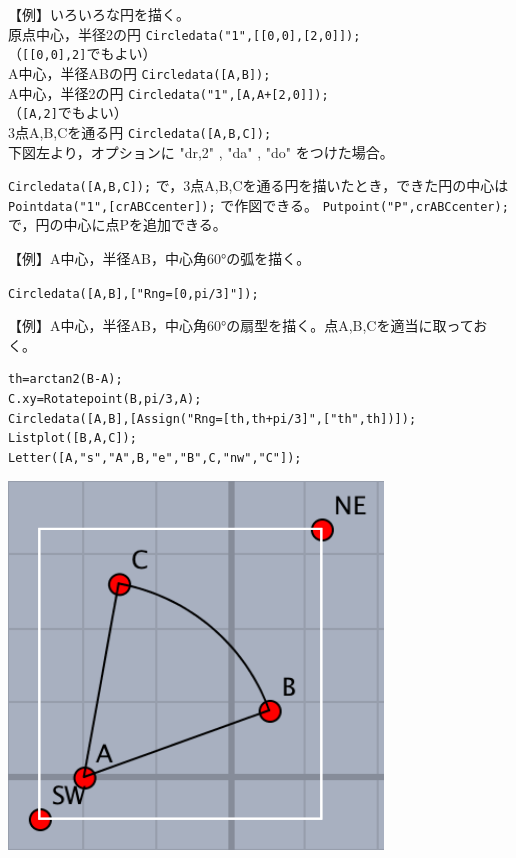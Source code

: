 \documentclass[papersize,a4paper,10pt,uplatex]{jsarticle}
\begin{document}
\begin{description}
\begin{tabbing}
【例】いろいろな円を描く。\\
 \>原点中心，半径2の円\> \verb|Circledata("1",[[0,0],[2,0]]);|\\
  \hspace{50mm}（\verb|[[0,0],2]|でもよい）\\
 \>A中心，半径ABの円\> \verb|Circledata([A,B]);|\\
 \>A中心，半径2の円\> \verb|Circledata("1",[A,A+[2,0]]);|\\
  \hspace{50mm}（\verb|[A,2]|でもよい）\\
 \>3点A,B,Cを通る円\> \verb|Circledata([A,B,C]);|\\
 \>下図左より，オプションに "dr,2" , "da" , "do" をつけた場合。
\end{tabbing}
\hspace{10mm} 
\vspace{\baselineskip}


 \verb|Circledata([A,B,C]);| で，3点A,B,Cを通る円を描いたとき，できた円の中心は \verb|Pointdata("1",[crABCcenter]);| で作図できる。
 \verb|Putpoint("P",crABCcenter);| で，円の中心に点Pを追加できる。%
 
\vspace{\baselineskip}
【例】A中心，半径AB，中心角60°の弧を描く。

\hspace{10mm}\verb|Circledata([A,B],["Rng=[0,pi/3]"]); |

\vspace{\baselineskip}
【例】A中心，半径AB，中心角60°の扇型を描く。点A,B,Cを適当に取っておく。

\begin{verbatim}
th=arctan2(B-A);
C.xy=Rotatepoint(B,pi/3,A);
Circledata([A,B],[Assign("Rng=[th,th+pi/3]",["th",th])]);
Listplot([B,A,C]); 
Letter([A,"s","A",B,"e","B",C,"nw","C"]);
\end{verbatim}

\begin{center}
\includegraphics[bb=0.00 0.00 180.01 177.01,width=4cm"] {Fig/circledata3.pdf}\hspace{12mm}
\end{center}


\end{description}
\end{document}
